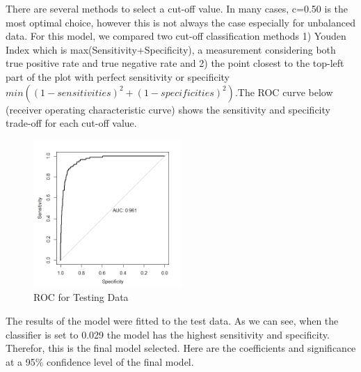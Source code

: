 \documentclass[a4paper,man,natbib,11pt]{article}
\begin{document}
There are several methods to select a cut-off value. In many cases, c=0.50 is the most optimal choice, however this is not always the case especially for unbalanced data. For this model, we compared two cut-off classification methods 1) Youden Index which is max(Sensitivity+Specificity), a measurement considering both true positive rate and true negative rate and 2) the point closest to the top-left part of the plot with perfect sensitivity or specificity $min((1-sensitivities)^{2}+(1-specificities)^{2})$.The ROC curve below (receiver operating characteristic curve) shows the sensitivity and specificity trade-off for each cut-off value. 

\begin{figure}[h!]
\centering
  \includegraphics[width=0.5\textwidth]{roc_logistic.png}
  \caption{ROC for Testing Data}
\end{figure}

The results of the model were fitted to the test data. As we can see, when the classifier is set to 0.029 the model has the highest sensitivity and specificity. Therefor, this is the final model selected. Here are the coefficients and significance at a 95\% confidence level of the final model. 
\end{document}
